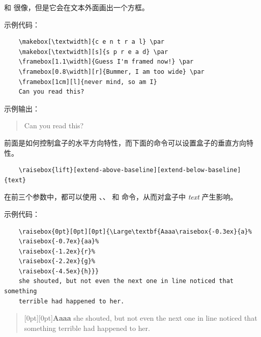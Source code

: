 \documentclass[UTF8]{ctexart}
\begin{document}
\texttt{\framebox} 和 \texttt{\makebox} 很像，但是它会在文本外面画出一个方框。

示例代码：
\begin{verbatim}
    \makebox[\textwidth]{c e n t r a l} \par
    \makebox[\textwidth][s]{s p r e a d} \par
    \framebox[1.1\width]{Guess I'm framed now!} \par
    \framebox[0.8\width][r]{Bummer, I am too wide} \par
    \framebox[1cm][l]{never mind, so am I}
    Can you read this?
\end{verbatim}

示例输出：
\begin{quote}
     \par
     \par
     \par
     \par
    Can you read this?
\end{quote}

前面是如何控制盒子的水平方向特性，而下面的命令可以设置盒子的垂直方向特性。
\begin{verbatim}
    \raisebox{lift}[extend-above-baseline][extend-below-baseline]{text}
\end{verbatim}
在前三个参数中，都可以使用 \texttt{\width}、\texttt{\height}、
\texttt{\depth} 和 \texttt{\totalheight} 命令，从而对盒子中 \emph{text} 产生影响。

示例代码：
\begin{verbatim}
    \raisebox{0pt}[0pt][0pt]{\Large\textbf{Aaaa\raisebox{-0.3ex}{a}%
    \raisebox{-0.7ex}{aa}%
    \raisebox{-1.2ex}{r}%
    \raisebox{-2.2ex}{g}%
    \raisebox{-4.5ex}{h}}}
    she shouted, but not even the next one in line noticed that something
    terrible had happened to her.
\end{verbatim}

\begin{quote}
    \raisebox{0pt}[0pt][0pt]{\Large\textbf{Aaaa%
    }}
    she shouted, but not even the next one in line noticed that something
    terrible had happened to her.
\end{quote}
\end{document}
